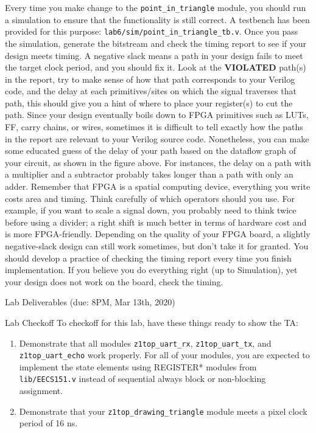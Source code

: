 \documentclass[11pt]{article}
\makeatletter
\renewcommand{\section}
{\@startsection {section}{1}{0pt}
 {-2ex}
 {1ex}
 {\bfseries\Large}}
\renewcommand{\subsection}
{\@startsection {subsection}{1}{0pt}
 {-1ex}
 {0.5ex}
 {\bfseries\normalsize}}
\makeatother
\begin{document}
Every time you make change to the \verb|point_in_triangle| module, you should run a simulation to ensure that the functionality is still correct. A testbench has been provided for this purpose: \verb|lab6/sim/point_in_triangle_tb.v|. Once you pass the simulation, generate the bitstream and check the timing report to see if your design meets timing. A negative slack means a path in your design fails to meet the target clock period, and you should fix it. Look at the \textbf{VIOLATED} path(s) in the report, try to make sense of how that path corresponds to your Verilog code, and the delay at each primitives/sites on which the signal traverses that path, this should give you a hint of where to place your register(s) to cut the path. Since your design eventually boils down to FPGA primitives such as LUTs, FF, carry chains, or wires, sometimes it is difficult to tell exactly how the paths in the report are relevant to your Verilog source code. Nonetheless, you can make some educated guess of the delay of your path based on the dataflow graph of your circuit, as shown in the figure above. For instances, the delay on a path with a multiplier and a subtractor probably takes longer than a path with only an adder. Remember that FPGA is a spatial computing device, everything you write costs area and timing. Think carefully of which operators should you use. For example, if you want to scale a signal down, you probably need to think twice before using a divider; a right shift is much better in terms of hardware cost and is more FPGA-friendly. Depending on the quality of your FPGA board, a slightly negative-slack design can still work sometimes, but don't take it for granted. You should develop a practice of checking the timing report every time you finish implementation. If you believe you do everything right (up to Simulation), yet your design does not work on the board, check the timing.

\section{Lab Deliverables (due: 8PM, Mar 13th, 2020)}
\subsection{Lab Checkoff}
To checkoff for this lab, have these things ready to show the TA:
\begin{enumerate}
  \item Demonstrate that all modules \verb|z1top_uart_rx|, \verb|z1top_uart_tx|, and \verb|z1top_uart_echo| work properly. For all of your modules, you are expected to implement the state elements using REGISTER* modules from \verb|lib/EECS151.v| instead of sequential always block or non-blocking assignment.
  \item Demonstrate that your \verb|z1top_drawing_triangle| module meets a pixel clock period of 16 ns.

\end{enumerate}
\end{document}
